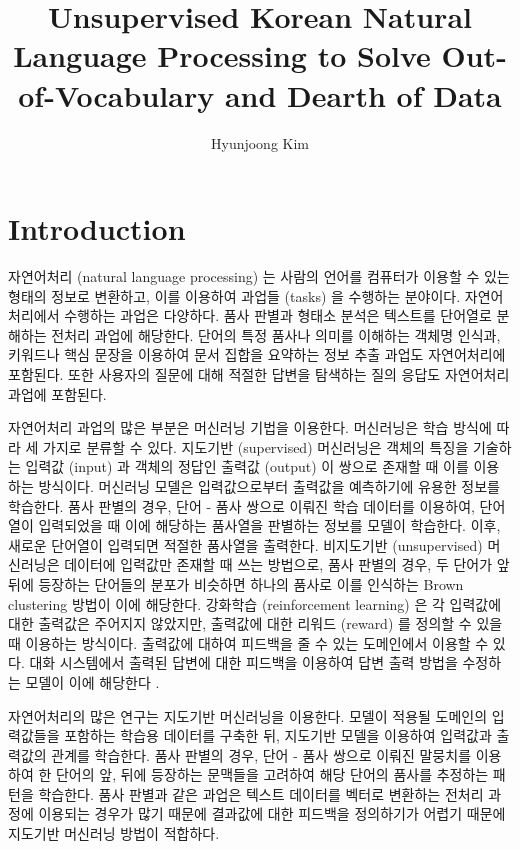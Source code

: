 \documentclass[11pt]{article}
\begin{document}
\title{Unsupervised Korean Natural Language Processing to Solve Out-of-Vocabulary and Dearth of Data}
\author{Hyunjoong Kim}

\maketitle
\smallskip

\section{Introduction}

자연어처리 (natural language processing) 는 사람의 언어를 컴퓨터가 이용할 수 있는 형태의 정보로 변환하고, 이를 이용하여 과업들 (tasks) 을 수행하는 분야이다.
자연어처리에서 수행하는 과업은 다양하다.
품사 판별과 형태소 분석은 텍스트를 단어열로 분해하는 전처리 과업에 해당한다.
단어의 특정 품사나 의미를 이해하는 객체명 인식과, 키워드나 핵심 문장을 이용하여 문서 집합을 요약하는 정보 추출 과업도 자연어처리에 포함된다.
또한 사용자의 질문에 대해 적절한 답변을 탐색하는 질의 응답도 자연어처리 과업에 포함된다.

자연어처리 과업의 많은 부분은 머신러닝 기법을 이용한다.
머신러닝은 학습 방식에 따라 세 가지로 분류할 수 있다.
지도기반 (supervised) 머신러닝은 객체의 특징을 기술하는 입력값 (input) 과 객체의 정답인 출력값 (output) 이 쌍으로 존재할 때 이를 이용하는 방식이다.
머신러닝 모델은 입력값으로부터 출력값을 예측하기에 유용한 정보를 학습한다.
품사 판별의 경우, 단어 - 품사 쌍으로 이뤄진 학습 데이터를 이용하여, 단어열이 입력되었을 때 이에 해당하는 품사열을 판별하는 정보를 모델이 학습한다.
이후, 새로운 단어열이 입력되면 적절한 품사열을 출력한다.
비지도기반 (unsupervised) 머신러닝은 데이터에 입력값만 존재할 때 쓰는 방법으로, 품사 판별의 경우, 두 단어가 앞 뒤에 등장하는 단어들의 분포가 비슷하면 하나의 품사로 이를 인식하는 Brown clustering \citep{brown1992class} 방법이 이에 해당한다.
강화학습 (reinforcement learning) 은 각 입력값에 대한 출력값은 주어지지 않았지만, 출력값에 대한 리워드 (reward) 를 정의할 수 있을 때 이용하는 방식이다.
출력값에 대하여 피드백을 줄 수 있는 도메인에서 이용할 수 있다.
대화 시스템에서 출력된 답변에 대한 피드백을 이용하여 답변 출력 방법을 수정하는 모델이 이에 해당한다 \citep{mo2018personalizing, singh2000reinforcement, li2016deep}. 

자연어처리의 많은 연구는 지도기반 머신러닝을 이용한다.
모델이 적용될 도메인의 입력값들을 포함하는 학습용 데이터를 구축한 뒤, 지도기반 모델을 이용하여 입력값과 출력값의 관계를 학습한다.
품사 판별의 경우, 단어 - 품사 쌍으로 이뤄진 말뭉치를 이용하여 한 단어의 앞, 뒤에 등장하는 문맥들을 고려하여 해당 단어의 품사를 추정하는 패턴을 학습한다.
품사 판별과 같은 과업은 텍스트 데이터를 벡터로 변환하는 전처리 과정에 이용되는 경우가 많기 때문에 결과값에 대한 피드백을 정의하기가 어렵기 때문에 지도기반 머신러닝 방법이 적합하다.
\end{document}
